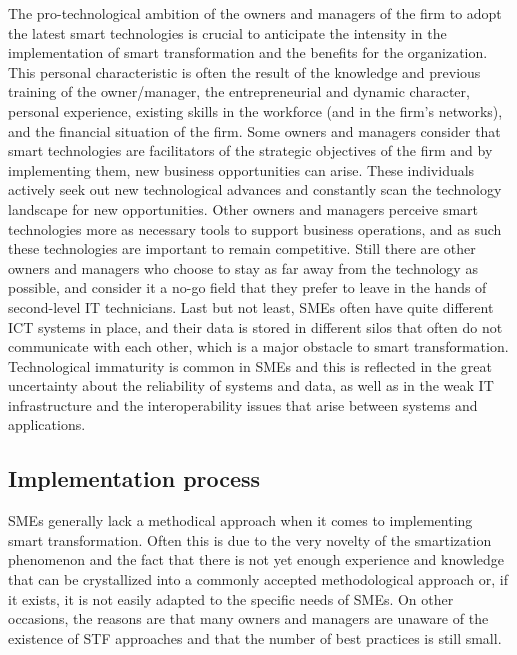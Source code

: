 \documentclass[
  letterpaper,
  DIV=11,
  numbers=noendperiod]{scrreprt}
\begin{document}
The pro-technological ambition of the owners and managers of the firm to
adopt the latest smart technologies is crucial to anticipate the
intensity in the implementation of smart transformation and the benefits
for the organization. This personal characteristic is often the result
of the knowledge and previous training of the owner/manager, the
entrepreneurial and dynamic character, personal experience, existing
skills in the workforce (and in the firm's networks), and the financial
situation of the firm. Some owners and managers consider that smart
technologies are facilitators of the strategic objectives of the firm
and by implementing them, new business opportunities can arise. These
individuals actively seek out new technological advances and constantly
scan the technology landscape for new opportunities. Other owners and
managers perceive smart technologies more as necessary tools to support
business operations, and as such these technologies are important to
remain competitive. Still there are other owners and managers who choose
to stay as far away from the technology as possible, and consider it a
no-go field that they prefer to leave in the hands of second-level IT
technicians. Last but not least, SMEs often have quite different ICT
systems in place, and their data is stored in different silos that often
do not communicate with each other, which is a major obstacle to smart
transformation. Technological immaturity is common in SMEs and this is
reflected in the great uncertainty about the reliability of systems and
data, as well as in the weak IT infrastructure and the interoperability
issues that arise between systems and applications.

\hypertarget{implementation-process}{%
\subsection{Implementation process}\label{implementation-process}}

SMEs generally lack a methodical approach when it comes to implementing
smart transformation. Often this is due to the very novelty of the
smartization phenomenon and the fact that there is not yet enough
experience and knowledge that can be crystallized into a commonly
accepted methodological approach or, if it exists, it is not easily
adapted to the specific needs of SMEs. On other occasions, the reasons
are that many owners and managers are unaware of the existence of STF
approaches and that the number of best practices is still small.
\end{document}
